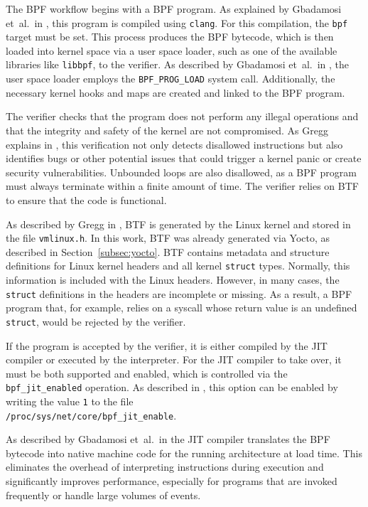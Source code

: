 The \ac{BPF} workflow begins with a \ac{BPF} program.  
As explained by Gbadamosi et~al.\ in \cite[p.~7]{gbadamosi2024ebpfruntimelinuxkernel}, this program is compiled using \texttt{clang}.  
For this compilation, the \texttt{bpf} target must be set.  
This process produces the \ac{BPF} bytecode, which is then loaded into kernel space via a user space loader, such as one of the available libraries like \texttt{libbpf}, to the verifier.  
As described by Gbadamosi et~al.\ in \cite[p.~4]{gbadamosi2024ebpfruntimelinuxkernel}, the user space loader employs the \texttt{BPF\_PROG\_LOAD} system call.  
Additionally, the necessary kernel hooks and maps are created and linked to the \ac{BPF} program.  

The verifier checks that the program does not perform any illegal operations and that the integrity and safety of the kernel are not compromised.  
As Gregg explains in \cite[Chap.~2.3.2]{Gregg_2020}, this verification not only detects disallowed instructions but also identifies bugs or other potential issues that could trigger a kernel panic or create security vulnerabilities.  
Unbounded loops are also disallowed, as a \ac{BPF} program must always terminate within a finite amount of time.  
The verifier relies on \ac{BTF} to ensure that the code is functional.  

As described by Gregg in \cite[Chap.~2.3.9]{Gregg_2020}, \ac{BTF} is generated by the Linux kernel and stored in the file \texttt{vmlinux.h}.  
In this work, \ac{BTF} was already generated via Yocto, as described in Section~\ref{subsec:yocto}.  
\ac{BTF} contains metadata and structure definitions for Linux kernel headers and all kernel \texttt{struct} types.  
Normally, this information is included with the Linux headers.  
However, in many cases, the \texttt{struct} definitions in the headers are incomplete or missing.  
As a result, a \ac{BPF} program that, for example, relies on a syscall whose return value is an undefined \texttt{struct}, would be rejected by the verifier.  

If the program is accepted by the verifier, it is either compiled by the \ac{JIT} compiler or executed by the interpreter.  
For the \ac{JIT} compiler to take over, it must be both supported and enabled, which is controlled via the \texttt{bpf\_jit\_enabled} operation.  
As described in \cite{jit}, this option can be enabled by writing the value \texttt{1} to the file\\
\texttt{/proc/sys/net/core/bpf\_jit\_enable}.  

As described by Gbadamosi et~al.\ in \cite[p.~4]{gbadamosi2024ebpfruntimelinuxkernel} the \ac{JIT} compiler translates the \ac{BPF} bytecode into native machine code for the running architecture at load time.  
This eliminates the overhead of interpreting instructions during execution and significantly improves performance, especially for programs that are invoked frequently or handle large volumes of events.  
 
